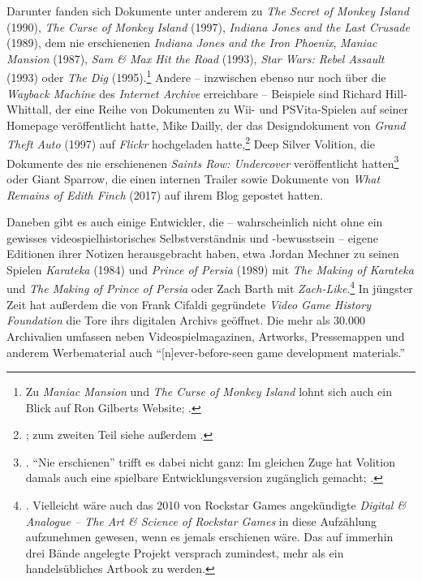 \documentclass[a5paper,pagesize,numbers=noenddot]{scrbook}
\begin{document}
Darunter fanden sich Dokumente unter anderem zu \textit{The Secret of Monkey Island} (1990), \textit{The Curse of Monkey Island} (1997), \textit{Indiana Jones and the Last Crusade} (1989), dem nie erschienenen \textit{Indiana Jones and the Iron Phoenix}, \textit{Maniac Mansion} (1987), \textit{Sam \& Max Hit the Road} (1993), \textit{Star Wars: Rebel Assault} (1993) oder \textit{The Dig} (1995).\footnote{Zu \textit{Maniac Mansion} und \textit{The Curse of Monkey Island} lohnt sich auch ein Blick auf Ron Gilberts Website; \autocite[vgl. etwa][]{gilbert_maniac_mansion_2014}.}
Andere -- inzwischen ebenso nur noch über die \textit{Wayback Machine} des \textit{Internet Archive} erreichbare -- Beispiele sind Richard Hill-Whittall, der eine Reihe von Dokumenten zu Wii- und PSVita-Spielen auf seiner Homepage veröffentlicht hatte,\autocite[Vgl.][]{hill_whittall_gdd_2017} Mike Dailly, der das Designdokument von \textit{Grand Theft Auto} (1997) auf \textit{Flickr} hochgeladen hatte,\footnote{\autocite[Vgl.][]{dailly_race_n_chase_2011}; zum zweiten Teil siehe außerdem \autocite{internet_archive_gta_2}.} Deep Silver Volition, die Dokumente des nie erschienenen \textit{Saints Row: Undercover} veröffentlicht hatten\footnote{\autocite[Vgl.][]{volition_thursday_2016}.
\enquote{Nie erschienen} trifft es dabei nicht ganz: Im gleichen Zuge hat Volition damals auch eine spielbare Entwicklungsversion zugänglich gemacht; \autocite[vgl.][]{frank_canceled_2016}.} oder Giant Sparrow, die einen internen Trailer sowie Dokumente von \textit{What Remains of Edith Finch} (2017) auf ihrem Blog gepostet hatten.\autocite[Vgl.][]{giant_sparrow_edith_2018}

Daneben gibt es auch einige Entwickler, die -- wahrscheinlich nicht ohne ein gewisses videospielhistorisches Selbstverständnis und -bewusstsein -- eigene Editionen ihrer Notizen herausgebracht haben, etwa Jordan Mechner zu seinen Spielen \textit{Karateka} (1984) und \textit{Prince of Persia} (1989) mit \textit{The Making of Karateka} und \textit{The Making of Prince of Persia} oder Zach Barth mit \textit{Zach-Like}.\footnote{\autocite[Vgl.][]{mechner_karateka_2012,mechner_prince_2020,barth_zach_like_2019}. Vielleicht wäre auch das 2010 von Rockstar Games angekündigte \textit{Digital \& Analogue -- The Art \& Science of Rockstar Games} in diese Aufzählung aufzunehmen gewesen, wenn es jemals erschienen wäre. Das auf immerhin drei Bände angelegte Projekt versprach zumindest, mehr als ein handelsübliches Artbook zu werden.}
In jüngster Zeit hat außerdem die von Frank Cifaldi gegründete \textit{Video Game History Foundation} die Tore ihrs digitalen Archivs geöffnet.
Die mehr als 30.000 Archivalien umfassen neben Videospielmagazinen, Artworks, Pressemappen und anderem Werbematerial auch \enquote{[n]ever-before-seen game development materials.}\autocite{salvador_library_2025}
\end{document}
